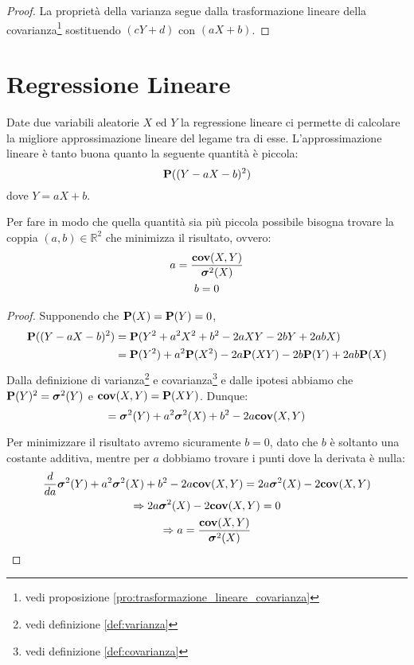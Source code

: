 \begin{proof}
  La proprietà della varianza segue dalla trasformazione lineare della covarianza\footnote{vedi proposizione \ref{pro:trasformazione_lineare_covarianza}} sostituendo \( (cY + d) \) con \( (aX + b) \).
\end{proof}

\section{Regressione Lineare} %
\begin{definition}
  Date due variabili aleatorie $X$ ed $Y$ la regressione lineare ci permette di calcolare la migliore approssimazione lineare del legame tra di esse.
  L'approssimazione lineare è tanto buona quanto la seguente quantità è piccola:
  \[ \mathbf{P}((Y - aX - b)^2) \]
  dove \( Y = aX + b \). %

  Per fare in modo che quella quantità sia più piccola possibile bisogna trovare la coppia \( (a,b) \in \mathbb{R}^2 \) che minimizza il risultato, ovvero:
  \begin{gather*}
    a = \frac{\mathbf{cov}(X,Y)}{\boldsymbol\sigma^2(X)} \\
    b = 0
  \end{gather*}
\end{definition}

\begin{proof}
  Supponendo che \( \mathbf{P}(X) = \mathbf{P}(Y) = 0 \),
  \begin{align*}
    \mathbf{P}((Y - aX - b)^2) &= \mathbf{P}(Y^2 + a^2 X^2 + b^2 - 2aXY - 2bY + 2abX) \\
    &= \mathbf{P}(Y^2) + a^2\mathbf{P}(X^2) - 2a\mathbf{P}(XY) - 2b\mathbf{P}(Y) + 2ab\mathbf{P}(X)
  \end{align*}
  Dalla definizione di varianza\footnote{vedi definizione \ref{def:varianza}} e covarianza\footnote{vedi definizione \ref{def:covarianza}} e dalle ipotesi abbiamo che \( \mathbf{P}(Y)^2 = \boldsymbol\sigma^2(Y) \) e \( \mathbf{cov}(X,Y) = \mathbf{P}(XY) \).
  Dunque:
  \[ = \boldsymbol\sigma^2(Y) + a^2 \boldsymbol\sigma^2(X) + b^2 -2a \mathbf{cov}(X,Y) \] %

  Per minimizzare il risultato avremo sicuramente \( b = 0 \), dato che $b$ è soltanto una costante additiva, mentre per $a$ dobbiamo trovare i punti dove la derivata è nulla:
  \begin{gather*}
    \frac{d}{da} \boldsymbol\sigma^2(Y) + a^2 \boldsymbol\sigma^2(X) + b^2 -2a \mathbf{cov}(X,Y) = 2a\boldsymbol\sigma^2(X) - 2 \mathbf{cov}(X,Y) \\
    \Rightarrow 2a\boldsymbol\sigma^2(X) - 2 \mathbf{cov}(X,Y) = 0\\
    \Rightarrow a = \frac{\mathbf{cov}(X,Y)}{\boldsymbol\sigma^2(X)}
  \end{gather*}

\end{proof}

